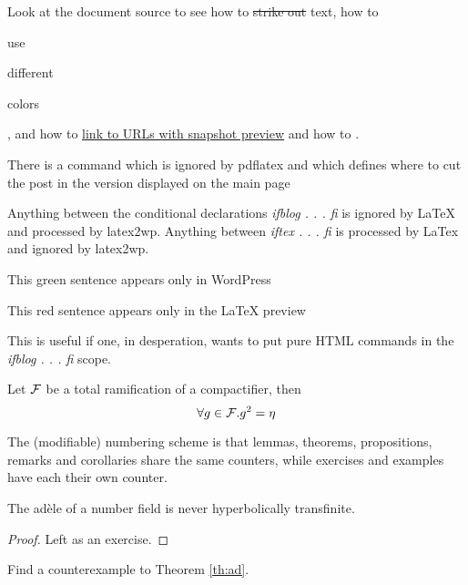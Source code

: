 \documentclass[12pt]{article}
\begin{document}
Look at the document source to see how to \sout{strike out} text, how
to \begin{red}use\end{red} \begin{green}different\end{green} \begin{blue}colors\end{blue},
and how to \href{http://www.google.com}{link to URLs with snapshot preview}
and how to .


There is a command which is ignored by pdflatex and which 
defines where to cut the post in the version displayed on the
main page\more

Anything between the conditional declarations {\em ifblog . . . fi}
is ignored by LaTeX and processed by latex2wp. Anything
between {\em iftex . . . fi} is processed by LaTex and ignored
by latex2wp.

\ifblog \begin{green}This green sentence appears only in WordPress \end{green} \fi

\iftex \begin{red}This red sentence appears only in the LaTeX preview \end{red} \fi

This is useful if one, in desperation, wants to put pure HTML commands
in the {\em ifblog . . . fi} scope.


\begin{lemma}[Main] \label{lm:main}
Let $\cal F$ be a total ramification of a compactifier, then
\begin{equation} \label{eq:lemma} \forall g \in {\cal F}. g^2 = \eta \end{equation}
\end{lemma}

The  (modifiable) numbering scheme is that lemmas, theorems, 
propositions, remarks and corollaries share the same counters,
while exercises and examples have each their own counter.

\begin{theorem} \label{th:ad} The ad\`ele of a number field is never
hyperbolically transfinite.
\end{theorem}

\begin{proof} Left as an exercise. \end{proof}

\begin{exercise} Find a counterexample to Theorem \ref{th:ad}.
\end{exercise}
\end{document}
